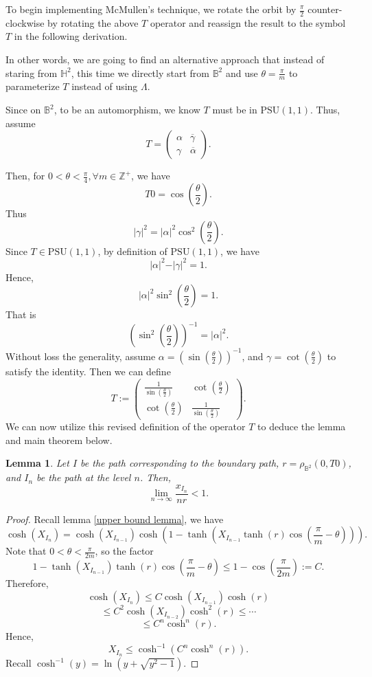 \documentclass[12pt,oneside]{sfsuthesis}
\theoremstyle{plain} %
\newtheorem{lemma}[theorem]{Lemma}
\theoremstyle{definition}  %
\theoremstyle{remark}  %
\theoremstyle{plain}
\begin{document}
{To begin implementing McMullen's technique, we rotate the orbit by $\frac{\pi}{2}$ counter-clockwise by rotating the above $T$ operator and reassign the result to the symbol $T$ in the following derivation.

In other words, we are going to find an alternative approach that instead of staring from $\mathbb{H}^2$, this time we directly start from $\mathbb{B}^2$ and use $\theta=\frac{\pi}{m}$ to parameterize $T$ instead of using $\Lambda$. 

Since on $\mathbb{B}^2$, to be an automorphism, we know $T$ must be in $\text{PSU}(1,1)$. Thus, assume
$$
T=\begin{pmatrix}
\alpha &  \overline{\gamma} \\
\gamma &  \overline{\alpha}
\end{pmatrix}.
$$

Then, for $0<\theta<\frac{\pi}{4}, \forall m\in\mathbb{Z}^+$, we have
$$
T0=\cos\left(\frac{\theta}{2}\right).
$$
Thus
$$
\vert \gamma\vert^2=\vert \alpha\vert^2\cos^2\left(\frac{\theta}{2}\right).
$$
Since $T\in\text{PSU}(1,1)$, by definition of $\text{PSU}(1,1)$, we have
$$
\vert \alpha\vert^2-\vert \gamma \vert^2=1.
$$
Hence,
$$
\vert \alpha\vert^2\sin^2\left(\frac{\theta}{2}\right)=1.
$$
That is
$$
\left(\sin^2\left(\frac{\theta}{2}\right) \right)^{-1}=\vert \alpha\vert^2.
$$
Without loss the generality, assume $\alpha=\left(\sin\left(\frac{\theta}{2}\right)\right)^{-1}$, and $\gamma=\cot\left(\frac{\theta}{2}\right)$ to satisfy the identity. 
Then we can define
$$
T:=\begin{pmatrix}
\frac{1}{\sin\left(\frac{\theta}{2}\right)} &  \cot\left(\frac{\theta}{2}\right) \\
\cot\left(\frac{\theta}{2}\right) &  \frac{1}{\sin\left(\frac{\theta}{2}\right)}
\end{pmatrix}.
$$
We can now utilize this revised definition of the operator $T$ to deduce the lemma and main theorem below.

\begin{lemma}
Let $I$ be the path corresponding to the boundary path, $r=\rho_{\mathbb{B}^2}\left(0,T0\right)$, and $I_n$ be the path at the level $n$. Then, 
$$
\lim\limits_{n\to\infty}\frac{x_{I_n}}{nr}<1.
$$
\end{lemma}
\begin{proof}
Recall lemma \ref{upper bound lemma}, we have
$$
\cosh\left( X_{I_n}\right) = \cosh\left( X_{I_{n-1}}\right)\cosh\left( 
1-\tanh\left(X_{I_{n-1}}\tanh\left(r\right)\cos\left(\frac{\pi}{m}-\theta\right) \right)\right).
$$
Note that $0<\theta<\frac{\pi}{2m}$, so the factor
$$
1-\tanh\left( X_{I_{n-1}}\right) \tanh\left(r\right) \cos\left(\frac{\pi}{m}-\theta \right)
\leq 1-\cos\left(\frac{\pi}{2m} \right):=C.
$$
Therefore, 
$$
\cosh\left(X_{I_n} \right)\leq C  \cosh\left( X_{I_{n-1}}\right)\cosh\left( r\right)
$$
$$
\leq C^2\cosh\left(X_{I_{n-2}} \right)\cosh^2\left( r \right)\leq \cdots
$$
$$
\leq C^n\cosh^n\left( r\right).
$$
Hence, 
$$
X_{I_{n}}\leq \cosh^{-1}\left( C^n\cosh^n\left(r\right)\right).
$$
Recall $\cosh^{-1}\left(y\right)=\ln\left(y+\sqrt{y^2-1} \right)$.


\end{proof}}
\end{document}
